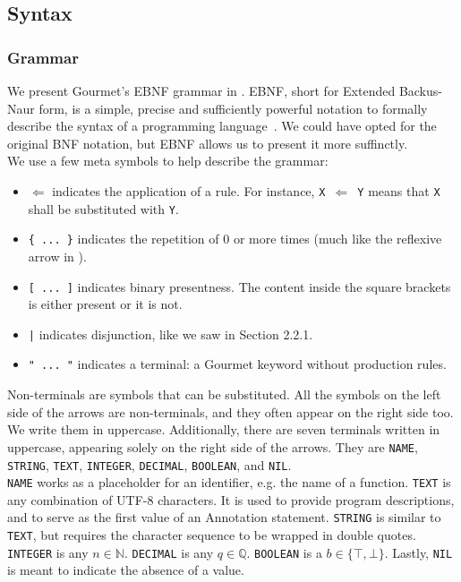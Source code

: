 \subsection{Syntax}

\subsubsection{Grammar}

We present Gourmet's EBNF grammar in . EBNF, short for Extended Backus-Naur form, is a simple, precise and sufficiently powerful notation to formally describe the syntax of a programming language~\cite{whatIsEBNF}. We could have opted for the original BNF notation, but EBNF allows us to present it more suffinctly. \\

We use a few meta symbols to help describe the grammar:

\begin{itemize}
    \item $\Leftarrow$ indicates the application of a rule. For instance, \texttt{X $\Leftarrow$ Y} means that \texttt{X} shall be substituted with \texttt{Y}.
    \item \texttt{\{ ... \}} indicates the repetition of 0 or more times (much like the reflexive arrow in ).
    \item  \texttt{[ ... ]} indicates binary presentness. The content inside the square brackets is either present or it is not.
    \item \texttt{|} indicates disjunction, like we saw in Section 2.2.1.
    \item \texttt{" ... "} indicates a terminal: a Gourmet keyword without production rules.
\end{itemize}

Non-terminals are symbols that can be substituted. All the symbols on the left side of the arrows are non-terminals, and they often appear on the right side too. We write them in uppercase. Additionally, there are seven terminals written in uppercase, appearing solely on the right side of the arrows. They are \texttt{NAME}, \texttt{STRING}, \texttt{TEXT}, \texttt{INTEGER}, \texttt{DECIMAL}, \texttt{BOOLEAN}, and \texttt{NIL}. \\

\texttt{NAME} works as a placeholder for an identifier, e.g. the name of a function. \texttt{TEXT} is any combination of UTF-8 characters. It is used to provide program descriptions, and to serve as the first value of an Annotation statement. \texttt{STRING} is similar to \texttt{TEXT}, but requires the character sequence to be wrapped in double quotes. \texttt{INTEGER} is any $n \in \mathbb{N}$. \texttt{DECIMAL} is any $q \in \mathbb{Q}$. \texttt{BOOLEAN} is a $b \in \{\top, \bot \}$. Lastly, \texttt{NIL} is meant to indicate the absence of a value. \\

